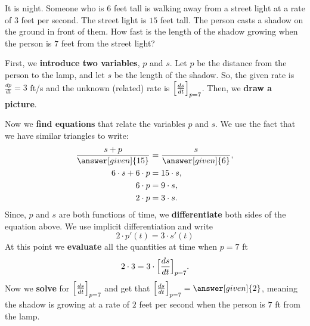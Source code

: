\documentclass{ximera}
\begin{document}
\begin{example}
  It is night. Someone who is $6$ feet tall is walking away from a
  street light at a rate of $3$ feet per second.  The street light is
  $15$ feet tall.  The person casts a shadow on the ground in front of
  them. How fast is the length of the shadow growing when the person
  is $7$ feet from the street light?

  \begin{explanation}
  First, we \textbf{introduce two variables}, $p$ and $s$. Let $p$ be the distance from the person to the lamp, and let $s$ be the length of the shadow.
  So, the given rate is $\frac{dp}{dt}=3$ ft/s and the unknown (related) rate is $\Bigl[\frac{ds}{dt}\Bigr]_{p=7}$.
    Then, we \textbf{draw a picture}.
    \begin{image}
    \end{image}

    Now we \textbf{find equations} that relate the variables $p$ and $s$. We use the fact that we
    have similar triangles to write:
    \begin{align*}
      \frac{s+p}{\answer[given]{15}} &= \frac{s}{\answer[given]{6}},\\
      6\cdot s + 6 \cdot p &= 15\cdot s,\\
      6\cdot p &=9\cdot s,\\
      2\cdot p &=3 \cdot s. 
    \end{align*}
    Since, $p$ and $s$ are both functions of time, we 
  \textbf{differentiate} both sides of the equation above. We  use
    implicit differentiation and write
        \[
    2\cdot p'(t) =3 \cdot s'(t)
    \]
    At this point we \textbf{evaluate} all the quantities at time when $p=7$ ft 
    \[
    2\cdot 3 = 3 \cdot \Bigl[\frac{ds}{dt}\Bigr]_{p=7}.
    \]
    Now we \textbf{solve} for  $\Bigl[\frac{ds}{dt}\Bigr]_{p=7} $ and get that
     $\Bigl[\frac{ds}{dt}\Bigr]_{p=7} = \answer[given]{2}$, 
      meaning the shadow is growing
    at a rate of $2$ feet per second when the person is $7$ ft from the lamp.\\
  \end{explanation}
\end{example}
\end{document}
